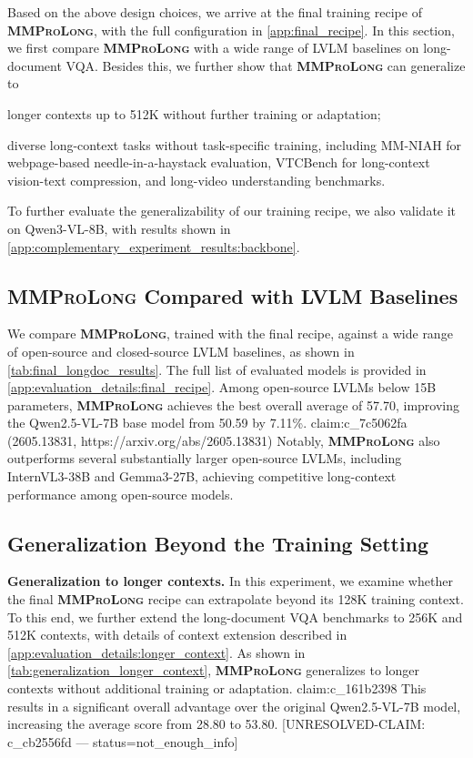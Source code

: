\documentclass{llmxive}
\providecommand{\modelname}{\textsc{\textbf{MMProLong}}\xspace}
\begin{document}
{\begin{figure}[t]
\end{figure}

Based on the above design choices, we arrive at the final training recipe of \modelname, with the full configuration in \cref{app:final_recipe}.
In this section, we first compare \modelname with a wide range of LVLM baselines on long-document VQA.
Besides this, we further show that \modelname can generalize to
\begin{inparaenum}[(i)]
\item longer contexts up to 512K without further training or adaptation;
\item diverse long-context tasks without task-specific training, including MM-NIAH for webpage-based needle-in-a-haystack evaluation, VTCBench for long-context vision-text compression, and long-video understanding benchmarks.
\end{inparaenum}
To further evaluate the generalizability of our training recipe, we also validate it on Qwen3-VL-8B, with results shown in \cref{app:complementary_experiment_results:backbone}.

\subsection{\modelname Compared with LVLM Baselines}
\label{sec:final_results:longdoc}

We compare \modelname, trained with the final recipe, against a wide range of open-source and closed-source LVLM baselines, as shown in \cref{tab:final_longdoc_results}.
The full list of evaluated models is provided in \cref{app:evaluation_details:final_recipe}.
Among open-source LVLMs below 15B parameters, \modelname achieves the best overall average of 57.70, improving the Qwen2.5-VL-7B base model from 50.59 by 7.11\%.
{{claim:c_7c5062fa}} (2605.13831, https://arxiv.org/abs/2605.13831)
Notably, \modelname also outperforms several substantially larger open-source LVLMs, including InternVL3-38B and Gemma3-27B, achieving competitive long-context performance among open-source models.\subsection{Generalization Beyond the Training Setting}
\label{sec:final_results:generalization}

\noindent\textbf{Generalization to longer contexts.} In this experiment, we examine whether the final \modelname recipe can extrapolate beyond its 128K training context.
To this end, we further extend the long-document VQA benchmarks to 256K and 512K contexts, with details of context extension described in \cref{app:evaluation_details:longer_context}.
As shown in \cref{tab:generalization_longer_context}, \modelname generalizes to longer contexts without additional training or adaptation.
{{claim:c_161b2398}}
This results in a significant overall advantage over the original Qwen2.5-VL-7B model, increasing the average score from 28.80 to 53.80. [UNRESOLVED-CLAIM: c_cb2556fd — status=not_enough_info]

}
\end{document}
